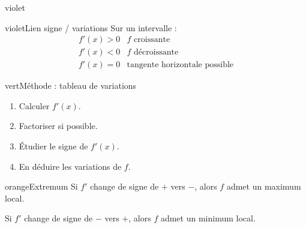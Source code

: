 \documentclass[11pt,a4paper]{article}
\begin{document}
\begin{landscape}
\begin{minipage}[t]{0.242\linewidth}
\begin{panel}{violet}
\begin{fichebox}{violet}{Lien signe / variations}
Sur un intervalle :
\[
\begin{array}{c|c}
f'(x)>0&f\text{ croissante}\\
f'(x)<0&f\text{ décroissante}\\
f'(x)=0&\text{tangente horizontale possible}
\end{array}
\]
\end{fichebox}

\begin{fichebox}{vert}{Méthode : tableau de variations}
\begin{enumerate}[leftmargin=*,itemsep=0.1em]
\item Calculer $f'(x)$.
\item Factoriser si possible.
\item Étudier le signe de $f'(x)$.
\item En déduire les variations de $f$.
\end{enumerate}
\end{fichebox}

\begin{fichebox}{orange}{Extremum}
Si $f'$ change de signe de $+$ vers $-$, alors $f$ admet un maximum local.

Si $f'$ change de signe de $-$ vers $+$, alors $f$ admet un minimum local.
\end{fichebox}

\end{panel}
\end{minipage}

\end{landscape}
\nopagecolor
\restoregeometry
\pagestyle{fancy}
\clearpage
\end{document}
